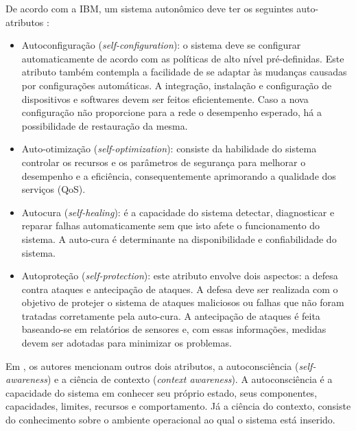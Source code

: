 \documentclass[tid,table]{texufpel} %
\begin{document}
De acordo com a IBM, um sistema autonômico deve ter os seguintes auto-atributos \cite{kephart03, iglesia15}: 

\begin{itemize}

\item Autoconfiguração (\textit{self-configuration}): o sistema deve se configurar automaticamente de acordo com as políticas de alto nível pré-definidas. Este atributo também contempla a facilidade de se adaptar às mudanças causadas por configurações automáticas. A integração, instalação e configuração de dispositivos e softwares devem ser feitos eficientemente. Caso a nova configuração não proporcione para a rede o desempenho esperado, há a possibilidade de restauração da mesma.

\item Auto-otimização (\textit{self-optimization}): consiste da habilidade do sistema controlar os recursos e os parâmetros de segurança para melhorar o desempenho e a eficiência, consequentemente aprimorando a qualidade dos serviços (QoS).

\item Autocura (\textit{self-healing}): é a capacidade do sistema detectar, diagnosticar e reparar falhas automaticamente sem que isto afete o funcionamento do sistema. A auto-cura é determinante na disponibilidade e confiabilidade do sistema.

\item Autoproteção (\textit{self-protection}): este atributo envolve dois aspectos: a defesa contra ataques e antecipação de ataques. A defesa deve ser realizada com o objetivo de protejer o sistema de ataques maliciosos ou falhas que não foram tratadas corretamente pela auto-cura. A antecipação de ataques é feita baseando-se em relatórios de sensores e, com essas informações, medidas devem ser adotadas para minimizar os problemas.

\end{itemize}

Em \cite{evesti13b}, os autores mencionam outros dois atributos, a autoconsciência (\textit{self-awareness}) e a ciência de contexto (\textit{context awareness}). A autoconsciência é a capacidade do sistema em conhecer seu próprio estado, seus componentes, capacidades, limites, recursos e comportamento. Já a ciência do contexto, consiste do conhecimento sobre o ambiente operacional ao qual o sistema está inserido. 


\end{document}
